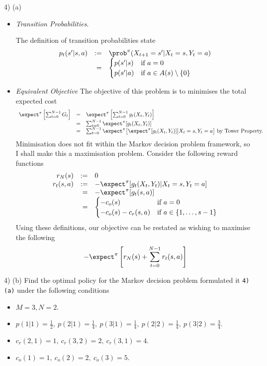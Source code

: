 \documentclass[11pt,a4paper]{article}
\begin{document}
\begin{answer}{4) (a)}
\begin{itemize}
    \item \textit{Transition Probabilities}.
    \par The definition of transition probabilities state
    \[\begin{array}{rrl}
      p_t(s'|s,a)&:=&\prob^\pi(X_{t+1}=s'|X_t=s,Y_t=a)\\
      &=&\begin{cases}
           p(s'|s)&\text{if }a=0\\
           p(s'|a)&\text{if }a\in A(s)\setminus\{0\}
         \end{cases}
    \end{array}\]

    \item \textit{Equivalent Objective}
    The objective of this problem is to minimises the total expected cost
    \[\begin{array}{rcl}
      \expect^\pi\left[\sum_{t=0}^{N-1}G_t\right]&=&\expect^\pi\left[\sum_{t=0}^{N-1}g_t(X_t,Y_t)\right]\\
      &=&\sum_{t=0}^{N-1}\expect^\pi[g_t(X_t,Y_t)]\\
      &=&\sum_{t=0}^{N-1}\expect^\pi\big[\expect^\pi[g_t(X_t,Y_t)]\big|X_t=s,Y_t=a\big]\text{ by Tower Property.}
    \end{array}\]
    Minimisation does not fit within the Markov decision problem framework, so I shall make this a maximisation problem. Consider the following reward functions
    \[\begin{array}{rrl}
      r_N(s)&:=&0\\
      r_t(s,a)&:=&-\expect^\pi[g_t(X_t,Y_t)|X_t=s,Y_t=a]\\
      &=&-\expect^\pi[g_t(s,a)]\\
      &=&\begin{cases}
              -c_o(s)&\text{if }a=0\\
              -c_o(s)-c_r(s,a)&\text{if }a\in\{1,\dots,s-1\}
            \end{cases}
    \end{array}\]
    Using these definitions, our objective can be restated as wishing to maximise the following
    \[ -\expect^\pi\left[r_N(s)+\sum_{t=0}^{N-1}r_t(s,a)\right] \]
  \end{itemize}
\end{answer}

\begin{question}{4) (b)}
  Find the optimal policy for the Markov decision problem formulated it \texttt{4) (a)} under the following conditions
  \begin{itemize}
    \item $M=3,N=2$.
    \item $p(1|1)=\frac12,\ p(2|1)=\frac14,\ p(3|1)=\frac14,\ p(2|2)=\frac14,\ p(3|2)=\frac34$.
    \item $c_r(2,1)=1,\ c_r(3,2)=2,\ c_r(3,1)=4$.
    \item $c_o(1)=1,\ c_o(2)=2,\ c_o(3)=5$.
  \end{itemize}
\end{question}
\end{document}
